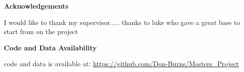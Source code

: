 
\mbox{}\newline\vspace{10mm} \mbox{}\LARGE
%
{\bf Acknowledgements} \normalsize \vspace{5mm}

I would like to thank my supervisor.....
thanks to luke who gave a great base to start from on the project


\mbox{}\newline\vspace{10mm} \mbox{}\LARGE{\bf Code and Data Availability} \normalsize

code and data is available at: \url{https://github.com/Don-Burns/Masters_Project}

